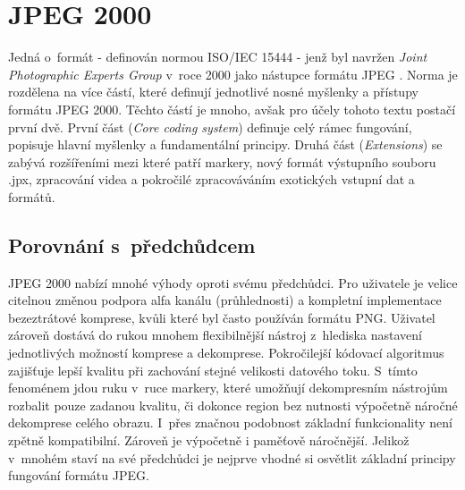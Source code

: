 \chapter{JPEG 2000}
\label{teorie}
Jedná o~formát \cite{kniha} - definován normou ISO/IEC 15444 - jenž byl navržen \textit{Joint Photographic Experts Group} v~roce 2000 jako nástupce formátu JPEG \cite{jpeg}. Norma je rozdělena na více částí, které definují jednotlivé nosné myšlenky a přístupy formátu JPEG 2000. Těchto částí je mnoho, avšak pro účely tohoto textu postačí první dvě. První část (\textit{Core coding system}) definuje celý rámec fungování, popisuje hlavní myšlenky a fundamentální principy. Druhá část (\textit{Extensions}) se zabývá rozšířeními mezi které patří markery, nový formát výstupního souboru .jpx, zpracování videa a pokročilé zpracováváním exotických vstupní dat a formátů.

\section{Porovnání s~předchůdcem}
JPEG 2000 nabízí mnohé výhody oproti svému předchůdci. Pro uživatele je velice citelnou změnou podpora alfa kanálu (průhlednosti) a kompletní implementace bezeztrátové komprese, kvůli které byl často používán formátu PNG. Uživatel zároveň dostává do rukou mnohem flexibilnější nástroj z~hlediska nastavení jednotlivých možností komprese a dekomprese. Pokročilejší kódovací algoritmus zajišťuje lepší kvalitu při zachování stejné velikosti datového toku. S~tímto fenoménem jdou ruku v~ruce markery, které umožňují dekompresním nástrojům rozbalit pouze zadanou kvalitu, či dokonce region bez nutnosti výpočetně náročné dekomprese celého obrazu. I~přes značnou podobnost základní funkcionality není zpětně kompatibilní. Zároveň je výpočetně i paměťově náročnější. Jelikož v~mnohém staví na své předchůdci je nejprve vhodné si osvětlit základní principy fungování formátu JPEG. 


